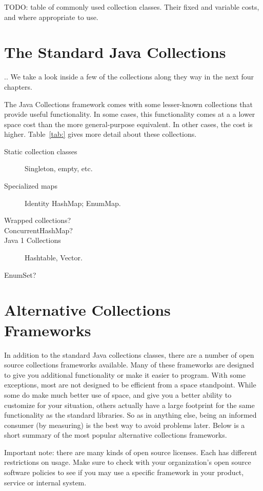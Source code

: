 
TODO: table of commonly used collection classes. Their fixed and variable
costs, and where appropriate to use. 

\section{The Standard Java Collections}

.. We take a look inside a few of the collections along they way in the next
four chapters. 

The Java Collections framework comes with some lesser-known collections that
provide useful functionality.  In some cases, this functionality comes at a 
a lower space cost than the more general-purpose equivalent.  In other cases,
the cost is higher. Table~\ref{tab:} gives more detail about these collections.

\begin{description}
\item[Static collection classes] Singleton, empty, etc.
\item[Specialized maps] Identity HashMap; EnumMap.
\item[Wrapped collections?]
\item[ConcurrentHashMap?]
\item[Java 1 Collections] Hashtable, Vector.
\item[EnumSet?]
\end{description}


\section{Alternative Collections Frameworks}
In addition to the standard Java collections classes, there are a number of
open source collections frameworks available. Many of these frameworks
are designed to give you additional functionality or make it easier to
program. With some exceptions, most are not designed to be efficient from a
space standpoint. While some do make much better use of space, and give you a
better ability to customize for your situation, others actually have a
large footprint for the same functionality as the standard libraries. So as in
anything else, being an informed consumer (by measuring) is the best way to
avoid problems later. Below is a short summary of the most
popular alternative collections frameworks.

Important note: there are many kinds of open source licenses. Each has different
restrictions on usage. Make sure to check with your organization's open
source software policies to see if you may use a specific framework in 
your product, service or internal system.

